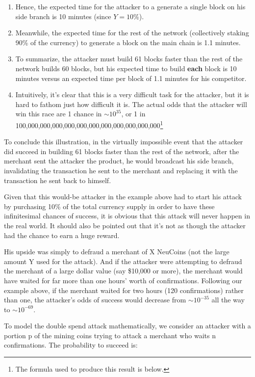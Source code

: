 \documentclass[a4paper,11pt]{article}
\begin{document}
\begin{enumerate}
{\begin{enumerate}
	\item{Hence, the expected time for the attacker to a generate a single block on his side branch is 10 minutes (since $Y = 10\%$).}
	\item{Meanwhile, the expected time for the rest of the network (collectively staking 90\% of the currency) to generate a block on the main chain is 1.1 minutes.}
	\item{To summarize, the attacker must build 61 blocks faster than the rest of the network builds 60 blocks, but his expected time to build \textbf{each} block is 10 minutes versus an expected time per block of 1.1 minutes for his competitor.}
	\item{Intuitively, it's clear that this is a very difficult task for the attacker, but it is hard to fathom just how difficult it is. The actual odds that the attacker will win this race are 1 chance in $\sim10^{35}$, or 1 in 100,000,000,000,000,000,000,000,000,000,000,000\footnote{The formula used to produce this result is below.} 
}
	\end{enumerate}
\item{To conclude this illustration, in the virtually impossible event that the attacker did succeed in building 61 blocks faster than the rest of the network, after the merchant sent the attacker the product, he would broadcast his side branch, invalidating the transaction he sent to the merchant and replacing it with the transaction he sent back to himself.}
}
\end{enumerate}
  
Given that this would-be attacker in the example above had to start his attack by purchasing 10\% of the total currency supply in order to have these infinitesimal chances of success, it is obvious that this attack will never happen in the real world. It should also be pointed out that it's not as though the attacker had the chance to earn a huge reward. 

His upside was simply to defraud a merchant of X NeuCoins (not the large amount Y used for the attack). And if the attacker were attempting to defraud the merchant of a large dollar value (say \$10,000 or more), the merchant would have waited for far more than one hours' worth of confirmations. Following our example above, if the merchant waited for two hours (120 confirmations) rather than one, the attacker's odds of success would decrease from $\sim10^{-35}$ all the way to $\sim10^{-69}$.


To model the double spend attack mathematically\cite{nakamoto2008bitcoin}, we consider an attacker with a portion p of the mining coins trying to attack a merchant who waits n confirmations. The probability to succeed is:
\end{document}

